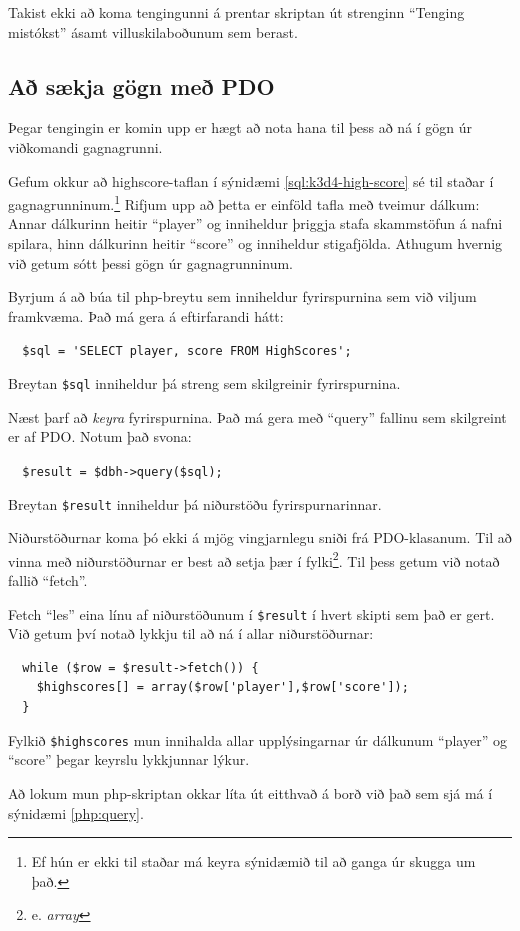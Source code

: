 Takist ekki að koma tengingunni á prentar skriptan út strenginn ``Tenging mistókst'' ásamt villuskilaboðunum sem berast.

\subsection{Að sækja gögn með PDO}
Þegar tengingin er komin upp er hægt að nota hana til þess að ná í gögn úr viðkomandi gagnagrunni.

Gefum okkur að highscore-taflan í sýnidæmi \ref{sql:k3d4-high-score} sé til staðar í gagnagrunninum.\footnote{Ef hún er ekki til staðar má keyra sýnidæmið til að ganga úr skugga um það.} Rifjum upp að þetta er einföld tafla með tveimur dálkum: Annar dálkurinn heitir ``player'' og inniheldur þriggja stafa skammstöfun á nafni spilara, hinn dálkurinn heitir ``score'' og inniheldur stigafjölda. Athugum hvernig við getum sótt þessi gögn úr gagnagrunninum.

Byrjum á að búa til php-breytu sem inniheldur fyrirspurnina sem við viljum framkvæma. Það má gera á eftirfarandi hátt:

\verb|  $sql = 'SELECT player, score FROM HighScores';|

Breytan \verb|$sql| inniheldur þá streng sem skilgreinir fyrirspurnina.

Næst þarf að \emph{keyra} fyrirspurnina. Það má gera með ``query'' fallinu sem skilgreint er af PDO. Notum það svona:

\verb|  $result = $dbh->query($sql);|

Breytan \verb|$result| inniheldur þá niðurstöðu fyrirspurnarinnar.

Niðurstöðurnar koma þó ekki á mjög vingjarnlegu sniði frá PDO-klasanum. Til að vinna með niðurstöðurnar er best að setja þær í fylki\footnote{e. \emph{array}}. Til þess getum við notað fallið ``fetch''.

Fetch ``les'' eina línu af niðurstöðunum í \verb|$result| í hvert skipti sem það er gert. Við getum því notað lykkju til að ná í allar niðurstöðurnar:

\begin{verbatim}
  while ($row = $result->fetch()) {
    $highscores[] = array($row['player'],$row['score']);
  }
\end{verbatim}

Fylkið \verb|$highscores| mun innihalda allar upplýsingarnar úr dálkunum ``player'' og ``score'' þegar keyrslu lykkjunnar lýkur.

Að lokum mun php-skriptan okkar líta út eitthvað á borð við það sem sjá má í sýnidæmi \ref{php:query}.

